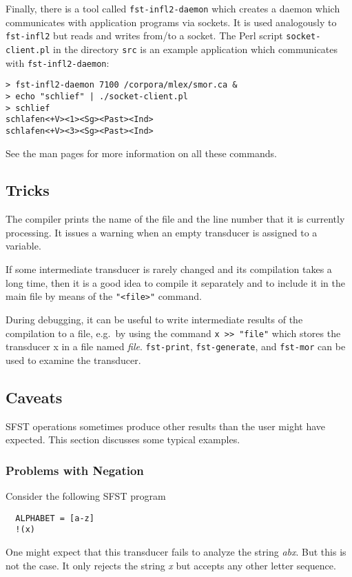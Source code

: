 \documentclass{article}
\begin{document}
Finally, there is a tool called \texttt{fst-infl2-daemon} which
creates a daemon which communicates with application programs via
sockets. It is used analogously to \texttt{fst-infl2} but reads and
writes from/to a socket. The Perl script \texttt{socket-client.pl} in
the directory \texttt{src} is an example application which
communicates with \texttt{fst-infl2-daemon}:
\begin{verbatim}
> fst-infl2-daemon 7100 /corpora/mlex/smor.ca &
> echo "schlief" | ./socket-client.pl
> schlief
schlafen<+V><1><Sg><Past><Ind>
schlafen<+V><3><Sg><Past><Ind>
\end{verbatim}

See the man pages for more information on all these commands.



\subsection{Tricks}

The compiler prints the name of the file and the line number that it
is currently processing. It issues a warning when an empty transducer
is assigned to a variable.

If some intermediate transducer is rarely changed and its compilation
takes a long time, then it is a good idea to compile it separately and
to include it in the main file by means of the \verb#"<file>"#
command.

During debugging, it can be useful to write intermediate results of
the compilation to a file, e.g.\ by using the command
\verb#x >> "file"# which stores the transducer x in a file named
\emph{file}. \verb#fst-print#, \verb#fst-generate#, and \verb#fst-mor#
can be used to examine the transducer.

\subsection{Caveats}

SFST operations sometimes produce other results than the user
might have expected. This section discusses some typical examples.

\subsubsection*{Problems with Negation} 
Consider the following SFST program
\begin{verbatim}
  ALPHABET = [a-z]
  !(x)
\end{verbatim}
One might expect that this transducer fails to analyze the string
\emph{abx}. But this is not the case. It only rejects the string
\emph{x} but accepts any other letter sequence.
\end{document}
